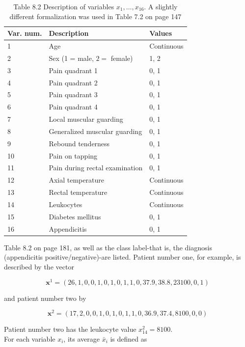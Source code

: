 \documentclass[10pt]{book}
\begin{document}
\begin{table}[htbp]
\begin{center}
\captionsetup{labelformat=empty}
\caption{Table 8.2 Description of variables $x_{1}, \ldots, x_{16}$. A slightly different formalization was used in Table 7.2 on page 147}
\begin{tabular}{|l|l|l|}
\hline
Var. num. & Description & Values \\

\hline
1 & Age & Continuous \\
\hline
2 & Sex (1 = male, $2=$ female) & 1, 2 \\
\hline
3 & Pain quadrant 1 & 0, 1 \\
\hline
4 & Pain quadrant 2 & 0, 1 \\
\hline
5 & Pain quadrant 3 & 0, 1 \\
\hline
6 & Pain quadrant 4 & 0, 1 \\
\hline
7 & Local muscular guarding & 0, 1 \\
\hline
8 & Generalized muscular guarding & 0, 1 \\
\hline
9 & Rebound tenderness & 0, 1 \\
\hline
10 & Pain on tapping & 0, 1 \\
\hline
11 & Pain during rectal examination & 0, 1 \\
\hline
12 & Axial temperature & Continuous \\
\hline
13 & Rectal temperature & Continuous \\
\hline
14 & Leukocytes & Continuous \\
\hline
15 & Diabetes mellitus & 0, 1 \\
\hline
16 & Appendicitis & 0, 1 \\
\hline
\end{tabular}
\end{center}
\end{table}

Table 8.2 on page 181, as well as the class label-that is, the diagnosis (appendicitis positive/negative)-are listed. Patient number one, for example, is described by the vector


$$
\boldsymbol{x}^{1}=(26,1,0,0,1,0,1,0,1,1,0,37.9,38.8,23100,0,1)
$$

and patient number two by

$$
\boldsymbol{x}^{2}=(17,2,0,0,1,0,1,0,1,1,0,36.9,37.4,8100,0,0)
$$

Patient number two has the leukocyte value $x_{14}^{2}=8100$.\\
For each variable $x_{i}$, its average $\bar{x}_{i}$ is defined as
\end{document}
